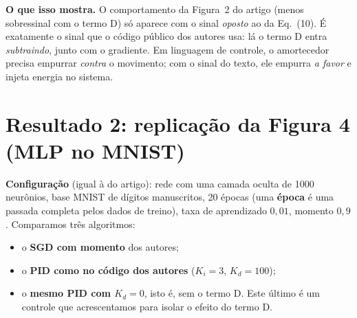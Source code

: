 \documentclass[11pt,a4paper]{article}
\begin{document}
\textbf{O que isso mostra.} O comportamento da Figura~2 do artigo (menos
sobressinal com o termo D) só aparece com o sinal \emph{oposto} ao da Eq.~(10).
É exatamente o sinal que o código público dos autores usa: lá o termo D entra
\emph{subtraindo}, junto com o gradiente. Em linguagem de controle, o amortecedor
precisa empurrar \emph{contra} o movimento; com o sinal do texto, ele empurra
\emph{a favor} e injeta energia no sistema.

\section{Resultado 2: replicação da Figura 4 (MLP no MNIST)}

\textbf{Configuração} (igual à do artigo): rede com uma camada oculta de 1000
neurônios, base MNIST de dígitos manuscritos, 20 épocas (uma \textbf{época} é uma
passada completa pelos dados de treino), taxa de aprendizado $0{,}01$, momento
$0{,}9$. Comparamos três algoritmos:
\begin{itemize}
  \item o \textbf{SGD com momento} dos autores;
  \item o \textbf{PID como no código dos autores} ($K_i = 3$, $K_d = 100$);
  \item o \textbf{mesmo PID com $K_d = 0$}, isto é, sem o termo D. Este último é um
        controle que acrescentamos para isolar o efeito do termo D.
\end{itemize}
\end{document}
